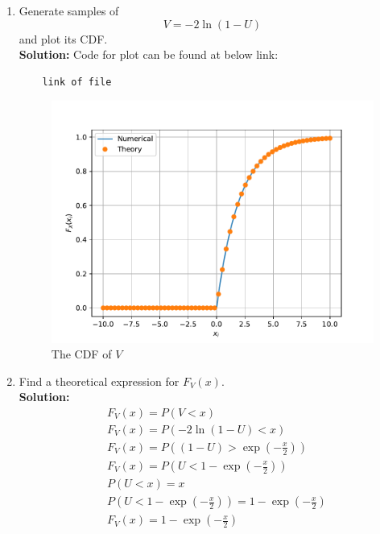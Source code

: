 \documentclass[journal,12pt,twocolumn]{IEEEtran}
\renewcommand\thesection{\arabic{section}}
\providecommand{\brak}[1]{\ensuremath{\left(#1\right)}}
\theoremstyle{remark}
\newcommand{\solution}{\noindent \textbf{Solution: }}
\numberwithin{equation}{section}
\begin{document}
\begin{enumerate}[label=\thesection.\arabic*
,ref=\thesection.\theenumi]
%
\item
Generate samples of 
%
\begin{equation}
V = -2\ln\brak{1-U}
\end{equation}
%
and plot its CDF. \\
\solution 
Code for plot can be found at below link:
\begin{lstlisting}
	link of file
\end{lstlisting}
\begin{figure}[h]
	\centering
	\includegraphics[width=\columnwidth]{figs/3/q3_1.pdf}
	\caption{The CDF of $V$}
	\label{fig:cdf_v}
	\end{figure}
\item Find a theoretical expression for $F_V(x)$. \\
\solution 
\begin{align}
	&F_V(x) = P(V < x) \\
	&F_V(x) = P(-2 \ln(1-U) < x) \\
	&F_V(x) = P\left((1-U) > \exp\brak{-\frac{x}{2}}\right) \\
	&F_V(x) = P\left(U < 1 - \exp\brak{-\frac{x}{2}}\right) \\
	&P(U < x) = x \\
	&P\left(U < 1 - \exp\brak{-\frac{x}{2}}\right) = 1 - \exp\brak{-\frac{x}{2}} \\
	&F_V(x) = 1 - \exp\brak{-\frac{x}{2}}
\end{align}

%
\end{enumerate}
\end{document}
